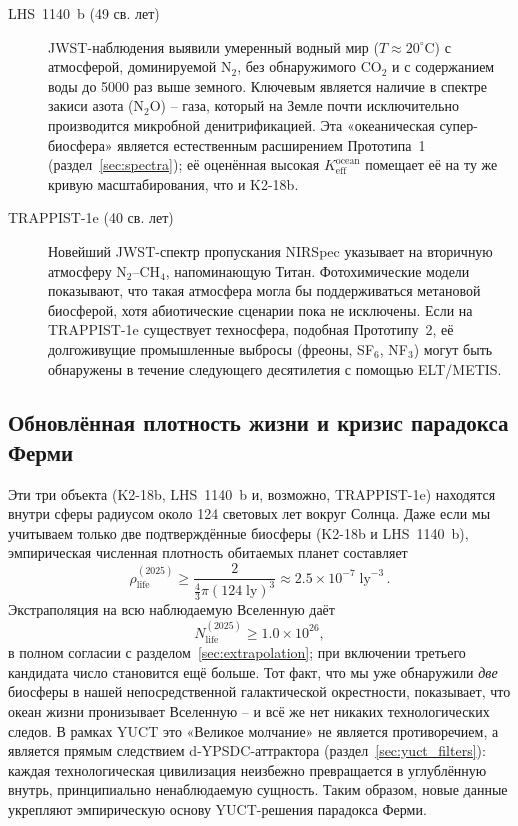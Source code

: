 \documentclass[11pt,a4paper]{article}
\begin{document}
	\begin{description}
		\item[LHS~1140~b (49 св. лет)] JWST-наблюдения \citep{Damiano2025} выявили умеренный водный мир (\(T\approx 20^{\circ}\mathrm{C}\)) с атмосферой, доминируемой N$_2$, без обнаружимого CO$_2$ и с содержанием воды до 5000 раз выше земного. Ключевым является наличие в спектре закиси азота (N$_2$O) – газа, который на Земле почти исключительно производится микробной денитрификацией. Эта «океаническая супер-биосфера» является естественным расширением Прототипа~1 (раздел~\ref{sec:spectra}); её оценённая высокая \(K_{\mathrm{eff}}^{\mathrm{ocean}}\) помещает её на ту же кривую масштабирования, что и K2-18b.
		\item[TRAPPIST-1e (40 св. лет)] Новейший JWST-спектр пропускания NIRSpec \citep{Glidden2025} указывает на вторичную атмосферу N$_2$–CH$_4$, напоминающую Титан. Фотохимические модели \citep{EagerNash2025} показывают, что такая атмосфера могла бы поддерживаться метановой биосферой, хотя абиотические сценарии пока не исключены. Если на TRAPPIST-1e существует техносфера, подобная Прототипу~2, её долгоживущие промышленные выбросы (фреоны, SF$_6$, NF$_3$) могут быть обнаружены в течение следующего десятилетия с помощью ELT/METIS.
	\end{description}
	
	\subsection{Обновлённая плотность жизни и кризис парадокса Ферми}
	Эти три объекта (K2-18b, LHS~1140~b и, возможно, TRAPPIST-1e) находятся внутри сферы радиусом около 124 световых лет вокруг Солнца. Даже если мы учитываем только две подтверждённые биосферы (K2-18b и LHS~1140~b), эмпирическая численная плотность обитаемых планет составляет
	\begin{equation}
		\rho_{\mathrm{life}}^{(2025)} \ge \frac{2}{\frac{4}{3}\pi (124\;\mathrm{ly})^{3}} \approx 2.5\times10^{-7}\;\mathrm{ly}^{-3}\, .
	\end{equation}
	Экстраполяция на всю наблюдаемую Вселенную даёт
	\begin{equation}
		N_{\mathrm{life}}^{(2025)} \ge 1.0\times10^{26} ,
	\end{equation}
	в полном согласии с разделом~\ref{sec:extrapolation}; при включении третьего кандидата число становится ещё больше. Тот факт, что мы уже обнаружили \emph{две} биосферы в нашей непосредственной галактической окрестности, показывает, что океан жизни пронизывает Вселенную – и всё же нет никаких технологических следов. В рамках YUCT это «Великое молчание» не является противоречием, а является прямым следствием d-YPSDC-аттрактора (раздел~\ref{sec:yuct_filters}): каждая технологическая цивилизация неизбежно превращается в углублённую внутрь, принципиально ненаблюдаемую сущность. Таким образом, новые данные укрепляют эмпирическую основу YUCT-решения парадокса Ферми.
	
\end{document}
